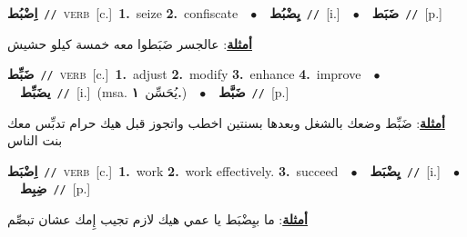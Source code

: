 \documentclass[10pt,a4paper,twoside]{article} %
\begin{document}
\begin{multicols}{2}
{{{{\setlength\topsep{0pt}\textbf{\foreignlanguage{arabic}{اِضْبُط}}\ {\color{gray}\texttt{//}\color{black}}\ \textsc{verb}\ [c.]\ \textbf{1.}~seize  \textbf{2.}~confiscate\ \ $\bullet$\ \ \setlength\topsep{0pt}\textbf{\foreignlanguage{arabic}{يِضْبُط}}\ {\color{gray}\texttt{//}\color{black}}\ [i.]\ \ $\bullet$\ \ \setlength\topsep{0pt}\textbf{\foreignlanguage{arabic}{ضَبَط}}\ {\color{gray}\texttt{//}\color{black}}\ [p.]\  \begin{flushright}\color{gray}\foreignlanguage{arabic}{\textbf{\underline{\foreignlanguage{arabic}{أمثلة}}}: عالجسر ضَبَطوا معه خمسة كيلو حشيش}\end{flushright}\color{black}} \vspace{2mm}

{\setlength\topsep{0pt}\textbf{\foreignlanguage{arabic}{ضَبِّط}}\ {\color{gray}\texttt{//}\color{black}}\ \textsc{verb}\ [c.]\ \textbf{1.}~adjust  \textbf{2.}~modify  \textbf{3.}~enhance  \textbf{4.}~improve\ \ $\bullet$\ \ \setlength\topsep{0pt}\textbf{\foreignlanguage{arabic}{يضَبِّط}}\ {\color{gray}\texttt{//}\color{black}}\ [i.]\ \color{gray}(msa. \foreignlanguage{arabic}{يُحَسِّن}~\foreignlanguage{arabic}{\textbf{١.}})\color{black}\ \ $\bullet$\ \ \setlength\topsep{0pt}\textbf{\foreignlanguage{arabic}{ضَبَّط}}\ {\color{gray}\texttt{//}\color{black}}\ [p.]\  \begin{flushright}\color{gray}\foreignlanguage{arabic}{\textbf{\underline{\foreignlanguage{arabic}{أمثلة}}}: ضَبِّط وضعك بالشغل وبعدها بسنتين اخطب واتجوز قبل هيك حرام تدبِّس معك بنت الناس}\end{flushright}\color{black}} \vspace{2mm}

{\setlength\topsep{0pt}\textbf{\foreignlanguage{arabic}{اِضْبَط}}\ {\color{gray}\texttt{//}\color{black}}\ \textsc{verb}\ [c.]\ \textbf{1.}~work  \textbf{2.}~work effectively.  \textbf{3.}~succeed\ \ $\bullet$\ \ \setlength\topsep{0pt}\textbf{\foreignlanguage{arabic}{يِضْبَط}}\ {\color{gray}\texttt{//}\color{black}}\ [i.]\ \ $\bullet$\ \ \setlength\topsep{0pt}\textbf{\foreignlanguage{arabic}{ضِبِط}}\ {\color{gray}\texttt{//}\color{black}}\ [p.]\  \begin{flushright}\color{gray}\foreignlanguage{arabic}{\textbf{\underline{\foreignlanguage{arabic}{أمثلة}}}: ما بيِضْبَط يا عمي هيك لازم تجيب إِمك عشان تبصِّم}\end{flushright}\color{black}} \vspace{2mm}

}}}
\end{multicols}
\end{document}
